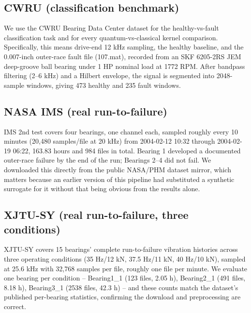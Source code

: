 \documentclass[3p,times,procedia]{elsarticle}
\begin{document}
\subsection{CWRU (classification benchmark)}
We use the CWRU Bearing Data Center dataset for the healthy-vs-fault classification task and for every quantum-vs-classical kernel comparison. Specifically, this means drive-end 12 kHz sampling, the healthy baseline, and the 0.007-inch outer-race fault file (107.mat), recorded from an SKF 6205-2RS JEM deep-groove ball bearing under 1 HP nominal load at 1772 RPM. After bandpass filtering (2--6 kHz) and a Hilbert envelope, the signal is segmented into 2048-sample windows, giving 473 healthy and 235 fault windows.

\subsection{NASA IMS (real run-to-failure)}
IMS 2nd test covers four bearings, one channel each, sampled roughly every 10 minutes (20,480 samples/file at 20 kHz) from 2004-02-12 10:32 through 2004-02-19 06:22, 163.83 hours and 984 files in total. Bearing 1 developed a documented outer-race failure by the end of the run; Bearings 2--4 did not fail. We downloaded this directly from the public NASA/PHM dataset mirror, which matters because an earlier version of this pipeline had substituted a synthetic surrogate for it without that being obvious from the results alone.

\subsection{XJTU-SY (real run-to-failure, three conditions)}
XJTU-SY covers 15 bearings' complete run-to-failure vibration histories across three operating conditions (35 Hz/12 kN, 37.5 Hz/11 kN, 40 Hz/10 kN), sampled at 25.6 kHz with 32,768 samples per file, roughly one file per minute. We evaluate one bearing per condition -- Bearing1\_1 (123 files, 2.05 h), Bearing2\_1 (491 files, 8.18 h), Bearing3\_1 (2538 files, 42.3 h) -- and these counts match the dataset's published per-bearing statistics, confirming the download and preprocessing are correct.
\end{document}
